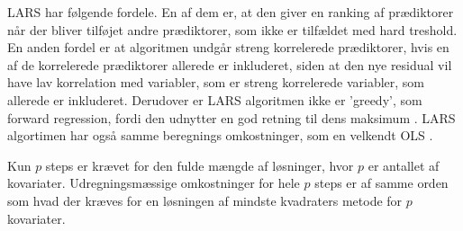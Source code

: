 LARS har følgende fordele.
En af dem er, at den giver en ranking af prædiktorer når der bliver tilføjet andre prædiktorer, som ikke er tilfældet med hard treshold. 
En anden fordel er at algoritmen undgår streng korrelerede prædiktorer, hvis en af de korrelerede prædiktorer allerede er inkluderet, siden at den nye residual vil have lav korrelation med variabler, som er streng korrelerede variabler, som allerede er inkluderet. 
Derudover er LARS algoritmen ikke er 'greedy', som forward regression, fordi den udnytter en god retning til dens maksimum . 
LARS algortimen har også samme beregnings omkostninger, som en velkendt OLS \citep{hui_hastie}. 


Kun \(p\) steps er krævet for den fulde mængde af løsninger, hvor \(p\) er antallet af kovariater.
Udregningsmæssige omkostninger for hele \(p\) steps er af samme orden som hvad der kræves for en løsningen af mindste kvadraters metode for \(p\) kovariater.

 
